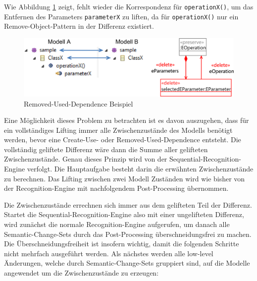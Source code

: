 \begin{itemize}
Wie Abbildung \ref{fig:removed-used-dependence} zeigt, fehlt wieder die Korrespondenz
für \texttt{operationX()}, um das Entfernen des Parameters \texttt{parameterX} zu liften, da für
\texttt{operationX()} nur ein Remove-Object-Pattern in der Differenz existiert. 

  \begin{figure}[htbp]
    \centering
    \includegraphics[scale=1.4]{images/removed-used-dependence.png}
    \caption{Removed-Used-Dependence Beispiel}
    \label{fig:removed-used-dependence}
  \end{figure}

\end{itemize}
Eine Möglichkeit dieses Problem zu betrachten ist es davon auszugehen, dass für ein vollständiges
Lifting immer alle Zwischenzustände des Modells benötigt werden, bevor eine Create-Use- oder
Removed-Used-Dependence entsteht. Die vollständig geliftete Differenz wäre dann die Summe aller
gelifteten Zwischenzustände. Genau dieses Prinzip wird von der Sequential-Recognition-Engine
verfolgt. Die Hauptaufgabe besteht darin die erwähnten Zwischenzustände zu berechnen. Das Lifting
zwischen zwei Modell Zuständen wird wie bisher von der Recognition-Engine mit nachfolgendem
Post-Processing übernommen.

Die Zwischenzustände errechnen sich immer aus dem gelifteten Teil der Differenz. Startet die 
Sequential-Recognition-Engine also mit einer ungelifteten Differenz, wird zunächst die normale
Recognition-Engine aufgerufen, um danach alle Semantic-Change-Sets durch das Post-Processing
überschneidungsfrei zu machen. Die Überschneidungsfreiheit ist insofern wichtig, damit die folgenden
Schritte nicht mehrfach ausgeführt werden. Als nächstes werden alle low-level Änderungen, welche
durch Semantic-Change-Sets gruppiert sind, auf die Modelle angewendet um die Zwischenzustände zu
erzeugen:


